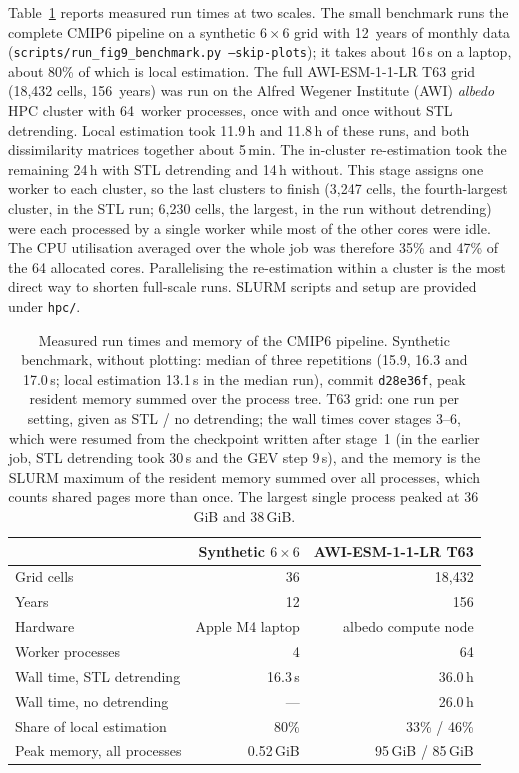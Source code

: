 \documentclass[preprint,12pt,a4paper]{elsarticle}
\newcommand{\revt}[1]{{#1}}
\begin{document}
Table~\ref{tab:timing} reports measured run times at two scales.
The small benchmark runs the complete CMIP6 pipeline on a synthetic
$6\times6$ grid with 12~years of monthly data
(\texttt{scripts/run\_fig9\_benchmark.py --skip-plots}); it takes about 16\,s on a
laptop, about 80\% of which is local estimation. The full
AWI-ESM-1-1-LR T63 grid (18{,}432 cells, 156~years) was run on the
\revt{Alfred Wegener Institute (AWI)} \emph{albedo} HPC cluster with
64~worker processes, once with and once without STL detrending.
Local estimation took 11.9\,h and 11.8\,h of these runs, and both
dissimilarity matrices together about 5\,min. The in-cluster
re-estimation took the remaining 24\,h with STL detrending and
14\,h without. This stage assigns one worker to each cluster, so the
last clusters to finish (3{,}247 cells, the fourth-largest cluster,
in the STL run; 6{,}230 cells, the largest, in the run without
detrending) were each processed by a single worker while most of
the other cores were idle. The CPU utilisation averaged over the
whole job was therefore 35\% and 47\% of the 64 allocated cores.
Parallelising the re-estimation within a cluster is the most direct
way to shorten full-scale runs. SLURM scripts and setup are provided
under \texttt{hpc/}.

\begin{table}[!htbp]
\centering
\small
\begin{tabular}{lrr}
\toprule
 & \textbf{Synthetic $6\times6$} & \textbf{AWI-ESM-1-1-LR T63} \\
\midrule
Grid cells & 36 & 18{,}432 \\
Years & 12 & 156 \\
Hardware & Apple M4 laptop & albedo compute node \\
Worker processes & 4 & 64 \\
Wall time, STL detrending & 16.3\,s & 36.0\,h \\
Wall time, no detrending & --- & 26.0\,h \\
Share of local estimation & 80\% & 33\% / 46\% \\
Peak memory, all processes & 0.52\,GiB & 95\,GiB / 85\,GiB \\
\bottomrule
\end{tabular}
\caption{Measured run times and memory of the CMIP6 pipeline.
  Synthetic benchmark, without plotting: median of three repetitions (15.9, 16.3 and
  17.0\,s; local estimation 13.1\,s in the median run), commit
  \texttt{d28e36f}, peak resident memory summed over the process
  tree. T63 grid: one run per setting, given as STL / no detrending;
  the wall times cover stages 3--6, which were resumed from the
  checkpoint written after stage~1 (in the earlier job, STL detrending
  took 30\,s and the GEV step 9\,s), and the memory is the SLURM maximum of the resident
  memory summed over all processes, which counts shared pages more
  than once. The largest single process peaked at 36\,GiB and
  38\,GiB.}
\label{tab:timing}
\end{table}
\end{document}
